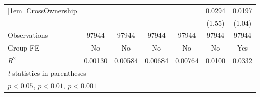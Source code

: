 {\begin{tabular}{l*{6}{c}}
[1em]
CrossOwnership  &                  &                  &                  &                  &   0.0294         &   0.0197         \\
                &                  &                  &                  &                  &   (1.55)         &   (1.04)         \\
\hline
Observations    &    97944         &    97944         &    97944         &    97944         &    97944         &    97944         \\
Group FE        &       No         &       No         &       No         &       No         &       No         &      Yes         \\
$ R^2 $         &  0.00130         &  0.00584         &  0.00684         &  0.00764         &   0.0100         &   0.0332         \\
\hline\hline
\multicolumn{7}{l}{\footnotesize \textit{t} statistics in parentheses}\\
\multicolumn{7}{l}{\footnotesize \sym{*} \(p<0.05\), \sym{**} \(p<0.01\), \sym{***} \(p<0.001\)}\\
\end{tabular}
}
